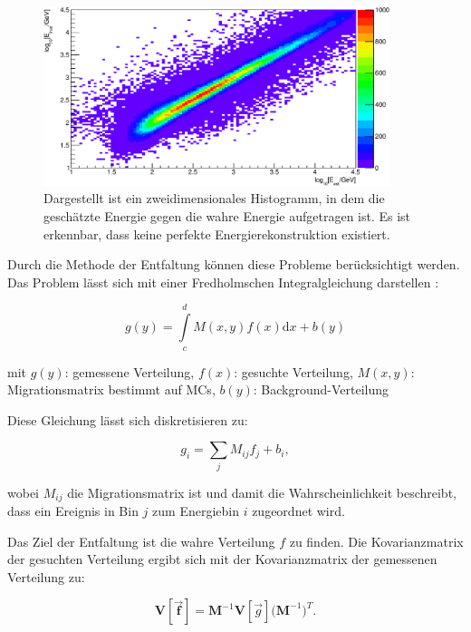 \begin{figure}
    \centering
    \includegraphics[width=0.9\textwidth]{./Plots/04_MrkAnalyse/EnergyEst_EnergyTrue.pdf}
    \caption{Dargestellt ist ein zweidimensionales Histogramm, in dem die geschätzte Energie gegen die wahre Energie aufgetragen ist. 
    Es ist erkennbar, dass keine perfekte Energierekonstruktion existiert.}
    \label{EnergyEst_EnergyTrue}
\end{figure}

Durch die Methode der Entfaltung können diese Probleme berücksichtigt werden. 
Das Problem lässt sich mit einer Fredholmschen Integralgleichung darstellen \cite{Blobel}:

\begin{equation}
 g(y)= \int\limits_c^d M(x,y) f(x) \mathrm{d}x + b(y)
\end{equation}
\begin{center}
  \small{mit $g(y)$: gemessene Verteilung, $f(x)$: gesuchte Verteilung, $M(x,y)$: Migrationsmatrix bestimmt auf MCs, $b(y)$: Background-Verteilung}
 \end{center}

Diese Gleichung lässt sich diskretisieren zu:

\begin{equation}
 g_i=\sum_j M_{ij}f_j+b_i,
\end{equation}

wobei $M_{ij}$ die Migrationsmatrix ist und damit die Wahrscheinlichkeit beschreibt, dass ein Ereignis in Bin $j$ zum Energiebin $i$ zugeordnet wird.

Das Ziel der Entfaltung ist die wahre Verteilung $f$ zu finden.
Die Kovarianzmatrix der gesuchten Verteilung ergibt sich mit der Kovarianzmatrix der gemessenen Verteilung zu:

\begin{equation}
 \mathbf{V[\vec{f}]}=\mathbf{M}^{-1}\mathbf{V}[\vec{g}]\mathbf{(M}^{-1})^T.
\end{equation}

